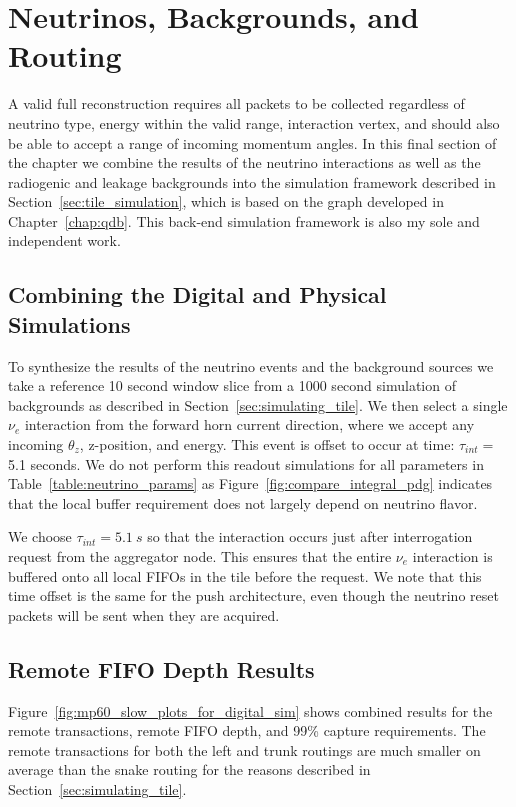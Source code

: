 \section{Neutrinos, Backgrounds, and Routing}

A valid full reconstruction requires all packets to be collected regardless of neutrino type, energy within the valid range, interaction vertex, and should also be able to accept a range of incoming momentum angles.
In this final section of the chapter we combine the results of the neutrino interactions as well as the radiogenic and leakage backgrounds into the simulation framework described in Section~\ref{sec:tile_simulation}, which is based on the graph developed in Chapter~\ref{chap:qdb}.
This back-end simulation framework is also my sole and independent work.

\subsection{Combining the Digital and Physical Simulations}

To synthesize the results of the neutrino events and the background sources we take a reference 10 second window slice from a 1000 second simulation of backgrounds as described in Section~\ref{sec:simulating_tile}.
We then select a single $\nu_{e}$ interaction from the forward horn current direction, where we accept any incoming $\theta_{z}$, z-position, and energy.
This event is offset to occur at time: $\tau_{int} = $5.1 seconds.
We do not perform this readout simulations for all parameters in Table~\ref{table:neutrino_params} as Figure~\ref{fig:compare_integral_pdg} indicates that the local buffer requirement does not largely depend on neutrino flavor.

We choose $\tau_{int} = 5.1~\unit{s}$ so that the interaction occurs just after interrogation request from the aggregator node.
This ensures that the entire $\nu_{e}$ interaction is buffered onto all local FIFOs in the tile before the request. 
We note that this time offset is the same for the push architecture, even though the neutrino reset packets will be sent when they are acquired.

\subsection{Remote FIFO Depth Results}

Figure~\ref{fig:mp60_slow_plots_for_digital_sim} shows combined results for the remote transactions, remote FIFO depth, and 99\% capture requirements.
The remote transactions for both the left and trunk routings are much smaller on average than the snake routing for the reasons described in Section~\ref{sec:simulating_tile}.


